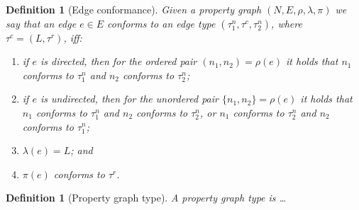 \documentclass[a4paper]{article}
\newtheorem{definition}[theorem]{Definition}
\newcommand{\rtype}{\tau^r}
\newcommand{\ctype}{\tau^c}
\newcommand{\ntype}{\tau^n}
\begin{document}
\begin{definition}[Edge conformance]
  Given a property graph $(N, E, \rho, \lambda, \pi)$ we say that an edge $e \in E$ \emph{conforms} to an edge type $(\ntype_1, \ctype, \ntype_2)$, where $\ctype = (L, \rtype)$, iff:
  \begin{enumerate}
    \item if $e$ is directed, then for the ordered pair $(n_1, n_2) = \rho(e)$ it holds that $n_1$ conforms to $\ntype_1$ and $n_2$ conforms to $\ntype_2$;
    \item if $e$ is undirected, then for the unordered pair $\{n_1, n_2\} = \rho(e)$ it holds that $n_1$ conforms to $\ntype_1$ and $n_2$ conforms to $\ntype_2$, or $n_1$ conforms to $\ntype_2$ and $n_2$ conforms to $\ntype_1$;
    \item $\lambda(e) = L$; and
    \item $\pi(e)$ conforms to $\rtype$.
  \end{enumerate}
\end{definition}

\begin{definition}[Property graph type]
  A \emph{property graph type} is \ldots
\end{definition}
\end{document}
